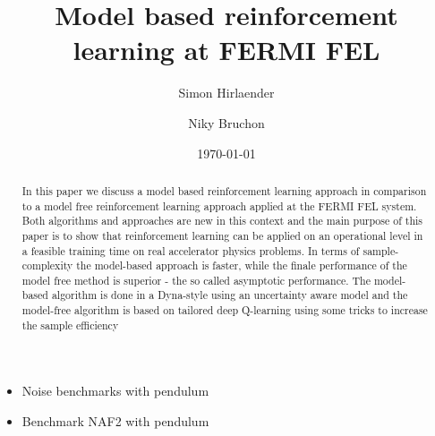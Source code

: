 \documentclass[
 reprint,
 amsmath,amssymb,amsfonts,clevref,
 aps,
prstab,
]{revtex4-2}
\begin{document}



\title{Model based reinforcement learning at FERMI FEL}



\author{Simon Hirlaender}
\author{Niky Bruchon}%

\date{\today}%


\begin{abstract}
In this paper we discuss a model based reinforcement learning approach in comparison to a model free reinforcement learning approach applied at the FERMI FEL system. Both algorithms and approaches are new in this context and the main purpose of this paper is to show that reinforcement learning can be applied on an operational level in a feasible training time on real accelerator physics problems. In terms of sample-complexity the model-based approach is faster, while the finale performance of the model free method is superior - the so called asymptotic performance. The model-based algorithm is done in a Dyna-style using an uncertainty aware model and the model-free algorithm is based on tailored deep Q-learning using some tricks to increase the sample efficiency
\end{abstract}
\maketitle
\begin{itemize}
	\item Noise benchmarks with pendulum
	\item Benchmark NAF2 with pendulum
	
\end{itemize}
\end{document}
